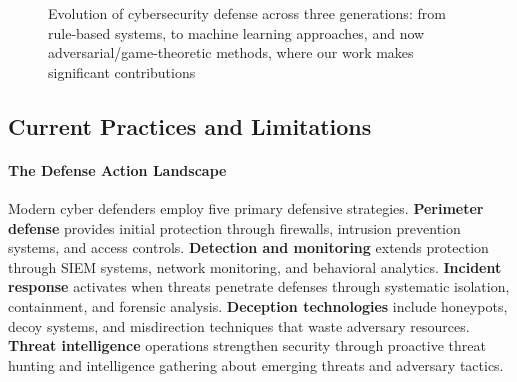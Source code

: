 \documentclass[12pt,oneside]{article}
\begin{document}
\begin{figure}[H]
\caption{Evolution of cybersecurity defense across three generations: from rule-based systems, to machine learning approaches, and now adversarial/game-theoretic methods, where our work makes significant contributions}
\label{fig:defense_evolution}
\end{figure}

\subsection{Current Practices and Limitations}

\paragraph{The Defense Action Landscape} Modern cyber defenders employ five primary defensive strategies. \textbf{Perimeter defense} provides initial protection through firewalls, intrusion prevention systems, and access controls. \textbf{Detection and monitoring} extends protection through SIEM systems, network monitoring, and behavioral analytics. \textbf{Incident response} activates when threats penetrate defenses through systematic isolation, containment, and forensic analysis. \textbf{Deception technologies} include honeypots, decoy systems, and misdirection techniques that waste adversary resources. \textbf{Threat intelligence} operations strengthen security through proactive threat hunting and intelligence gathering about emerging threats and adversary tactics.
\end{document}
